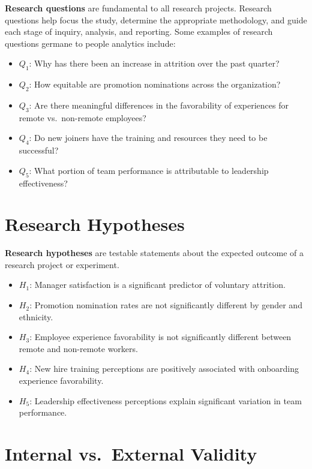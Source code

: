 \documentclass[]{book}
\providecommand{\tightlist}{%
  \setlength{\itemsep}{0pt}\setlength{\parskip}{0pt}}
\begin{document}
\textbf{Research questions} are fundamental to all research projects. Research questions help focus the study, determine the appropriate methodology, and guide each stage of inquiry, analysis, and reporting. Some examples of research questions germane to people analytics include:

\begin{itemize}
\tightlist
\item
  \(Q_1\): Why has there been an increase in attrition over the past quarter?
\item
  \(Q_2\): How equitable are promotion nominations across the organization?
\item
  \(Q_3\): Are there meaningful differences in the favorability of experiences for remote vs.~non-remote employees?
\item
  \(Q_4\): Do new joiners have the training and resources they need to be successful?
\item
  \(Q_5\): What portion of team performance is attributable to leadership effectiveness?
\end{itemize}

\hypertarget{research-hypotheses}{%
\section{Research Hypotheses}\label{research-hypotheses}}

\textbf{Research hypotheses} are testable statements about the expected outcome of a research project or experiment.

\begin{itemize}
\tightlist
\item
  \(H_1\): Manager satisfaction is a significant predictor of voluntary attrition.
\item
  \(H_2\): Promotion nomination rates are not significantly different by gender and ethnicity.
\item
  \(H_3\): Employee experience favorability is not significantly different between remote and non-remote workers.
\item
  \(H_4\): New hire training perceptions are positively associated with onboarding experience favorability.
\item
  \(H_5\): Leadership effectiveness perceptions explain significant variation in team performance.
\end{itemize}

\hypertarget{internal-vs.external-validity}{%
\section{Internal vs.~External Validity}\label{internal-vs.external-validity}}
\end{document}
